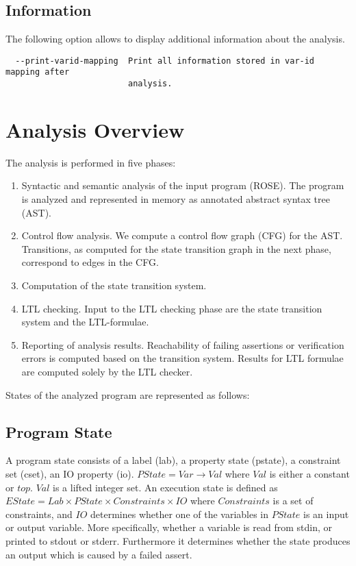 \documentclass[natbib]{article}
\begin{document}
\subsection{Information}
The following option allows to display additional information about the analysis.
\begin{verbatim}
  --print-varid-mapping  Print all information stored in var-id mapping after 
                         analysis.
\end{verbatim}


\section{Analysis Overview}

The analysis is performed in five phases:

\begin{enumerate}
\item Syntactic and semantic analysis of the input program (ROSE). The program is analyzed and represented in memory as annotated abstract syntax tree (AST).
\item Control flow analysis. We compute a control flow graph (CFG) for the AST. Transitions, as computed for the state transition graph in the next phase, correspond to edges in the CFG.
\item Computation of the state transition system.
\item LTL checking. Input to the LTL checking phase are the state transition system and the LTL-formulae.
\item Reporting of analysis results. Reachability of failing assertions or verification errors is computed based 
on the transition system. Results for LTL formulae are computed solely by the LTL checker.
\end{enumerate}

States of the analyzed program are represented as follows:

\subsection{Program State}

A program state consists of a label (lab), a property state (pstate),
a constraint set (cset), an IO property (io). $PState = Var
\rightarrow Val$ where $Val$ is either a constant or $top$. $Val$ is a
lifted integer set. An execution state is defined as $EState = Lab \times
PState \times Constraints \times IO$ where $Constraints$ is a set of
constraints, and $IO$ determines whether one of the variables in $PState$ is
an input or output variable. More specifically, whether a variable is
read from stdin, or printed to stdout or stderr. Furthermore it
determines whether the state produces an output which is caused by a
failed assert.
\end{document}
